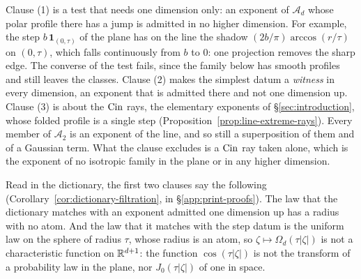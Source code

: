 Clause (1) is a test that needs one dimension only: an exponent of $\mathcal{A}_d$ whose polar
profile there has a jump is admitted in no higher dimension. For example, the step
$b\,\mathbf 1_{(0,\tau)}$ of the plane has on the line the shadow $(2b/\pi)\arccos(r/\tau)$ on
$(0,\tau)$, which falls continuously from $b$ to $0$: one projection removes the sharp edge. The
converse of the test fails, since the family below has smooth profiles and still leaves the
classes. Clause (2) makes the simplest datum a \emph{witness} in every dimension, an exponent
that is admitted there and not one dimension up. Clause (3) is about the $\operatorname{Cin}$ rays, the
elementary exponents of \S\ref{sec:introduction}, whose folded profile is a single step
(Proposition~\ref{prop:line-extreme-rays}). Every member of $\mathcal{A}_2$ is an exponent of
the line, and so still a superposition of them and of a Gaussian term. What the clause excludes
is a $\operatorname{Cin}$ ray
taken alone, which is the exponent of no isotropic family in the plane or in any higher
dimension.

Read in the dictionary, the first two clauses say the following
(Corollary~\ref{cor:dictionary-filtration}, in \S\ref{app:print-proofs}). The law that the
dictionary matches with an exponent admitted one dimension up has a radius with no atom. And
the law that it matches with the step datum is the uniform law on the sphere of radius $\tau$,
whose radius is an atom, so $\zeta \mapsto \Omega_d(\tau|\zeta|)$ is
not a characteristic function on $\mathbb{R}^{d+1}$: the function $\cos(\tau|\zeta|)$ is not the
transform of a probability law in the plane, nor $J_0(\tau|\zeta|)$ of one in space.

